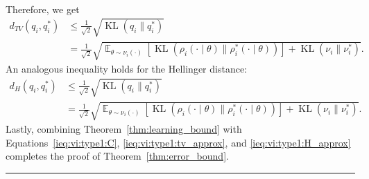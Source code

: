 \documentclass[preprint,3p,times]{elsarticle}
\DeclareMathOperator{\E}{\mathbb{E}}
\DeclareMathOperator{\KL}{KL}
\newcommand{\BlackBox}{\rule{1.5ex}{1.5ex}}  %
\renewenvironment{proof}{\par\noindent{\bf Proof\ }}{\hfill\BlackBox\\[2mm]}
\newenvironment{proof}{\par\noindent{\bf Proof\ }}{\hfill\BlackBox\\[2mm]}
\begin{document}
\begin{proof}
\begin{align}
\label{eq:kl_rewritten}
\end{align}
Therefore, we get
\begin{align}
d_{TV}(q_i,q_i^*) & \leq \frac{1} {\sqrt{2}}\sqrt{\KL\left(q_i \lVert q^*_i\right)} \nonumber \\
&= \frac{1}{\sqrt{2}}\sqrt{\E_{\theta \sim \nu_i(\cdot)}\left[\KL\left(\rho_i(\cdot\mid \theta) \lVert \rho_i^*(\cdot \mid \theta) \right) \right] +\KL\left(\nu_i \lVert \nu_i^*\right)}.
\label{ieq:vi:type1:tv_approx}
\end{align}
An analogous inequality holds for the Hellinger distance:
\begin{align}
d_{H}(q_i,q_i^*) & \leq \frac{1}{\sqrt{2}}\sqrt{\KL\left(q_i \lVert q^*_i\right)} \nonumber \\
& = \frac{1}{\sqrt{2}}\sqrt{\E_{\theta \sim \nu_i(\cdot)}\left[\KL\left(\rho_i(\cdot \mid \theta) \lVert \rho_i^*(\cdot \mid \theta) \right) \right] +\KL\left(\nu_i \lVert \nu_i^*\right)}.
\label{ieq:vi:type1:H_approx}
\end{align}
Lastly, combining Theorem~\ref{thm:learning_bound} with
Equations~\eqref{ieq:vi:type1:C}, \eqref{ieq:vi:type1:tv_approx}, and \eqref{ieq:vi:type1:H_approx}
completes the proof of Theorem~\ref{thm:error_bound}.
\end{proof}
\end{document}

